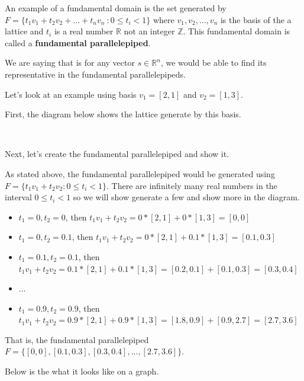 \documentclass[11pt]{article}
\providecommand{\tightlist}{%
      \setlength{\itemsep}{0pt}\setlength{\parskip}{0pt}}
\def\lt{<}
\begin{document}
An example of a fundamental domain is the set generated by
\(F = \{t_1v_1 + t_2v_2 + ... + t_nv_n\ : 0 \leq t_i \lt 1 \}\) where
\(v_1, v_2, ..., v_n\) is the basis of the a lattice and \(t_i\) is a
real number \(\mathbb{R}\) not an integer \(\mathbb{Z}\). This
fundamental domain is called a \textbf{fundamental parallelepiped}.

We are saying that is for any vector \(s \in \mathbb{R}^n\), we would be
able to find its representative in the fundamental parallelepipeds.

Let's look at an example using basis \(v_1 = [2, 1]\) and
\(v_2 = [1, 3]\).

First, the diagram below shows the lattice generate by this basis.

    \begin{center}
    \end{center}
    { \hspace*{\fill} \\}
    
    Next, let's create the fundamental parallelepiped and show it.

As stated above, the fundamental parallelepiped would be generated using
\(F = \{t_1v_1 + t_2v_2 : 0 \leq t_i \lt 1 \}\). There are infinitely
many real numbers in the interval \(0 \leq t_i \lt 1\) so we will show
generate a few and show more in the diagram.

\begin{itemize}
\tightlist
\item
  \(t_1 = 0, t_2 = 0\), then
  \(t_1v_1 + t_2v_2 = 0 * [2, 1] + 0 * [1, 3] = [0, 0]\)
\item
  \(t_1 = 0, t_2 = 0.1\), then
  \(t_1v_1 + t_2v_2 = 0 * [2, 1] + 0.1 * [1, 3] = [0.1, 0.3]\)
\item
  \(t_1 = 0.1, t_2 = 0.1\), then
  \(t_1v_1 + t_2v_2 = 0.1 * [2, 1] + 0.1 * [1, 3] = [0.2, 0.1] + [0.1, 0.3] = [0.3, 0.4]\)
\item
  \(...\)
\item
  \(t_1 = 0.9, t_2 = 0.9\), then
  \(t_1v_1 + t_2v_2 = 0.9 * [2, 1] + 0.9 * [1, 3] = [1.8, 0.9] + [0.9, 2.7] = [2.7, 3.6]\)
\end{itemize}

That is, the fundamental parallelepiped
\(F = \{[0, 0], [0.1, 0.3], [0.3, 0.4], ..., [2.7, 3.6]\}\).

Below is the what it looks like on a graph.
\end{document}
